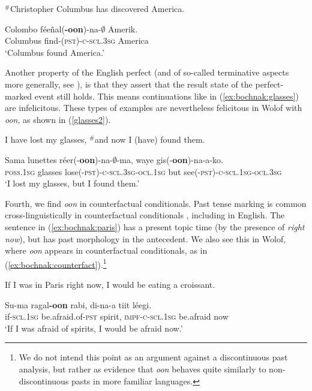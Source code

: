 \documentclass[output=paper,newtxmath,modfonts,nonflat,draftmode]{langsci/langscibook}
\begin{document}
\ea\label{columbus2}
$^{\#}$Christopher Columbus has discovered America.
\z

\ea\label{ex:bochnak:columbus}
\gll Colombo f\'ee\~nal(\textbf{-oon})-na-$\emptyset$ Amerik.\\
Columbus find-(\textsc{pst})\textsc{-c-scl.3sg} America\\
\glt `Columbus found America.'
\z

Another property of the English perfect (and of so-called terminative aspects more generally, see \citealt{bohnemeyer02grammar}), is that they assert that the result state of the perfect-marked event still holds. This means continuations like in (\ref{ex:bochnak:glasses}) are infelicitous. These types of examples are nevertheless felicitous in Wolof with \textit{oon}, as shown in (\ref{glasses2}).

\ea\label{ex:bochnak:glasses} 
I have lost my glasses, $^{\#}$and now I (have) found them. 
\z

\ea\label{glasses2}
\gll Sama lunettes r\'eer(-\textbf{oon})-na-$\emptyset$-ma, waye gis(-\textbf{oon})-na-a-ko. \\
\textsc{poss.1sg} glasses lose\textsc{(-pst)-c-scl.3sg-ocl.1sg} but see\textsc{(-pst)-c-scl.1sg-ocl.3sg} \\
\glt `I lost my glasses, but I found them.' 
\z

Fourth, we find \textit{oon} in counterfactual conditionals. Past tense marking is common cross-linguistically in counterfactual conditionals \citep{iatridou00grammatical, halpert12aspect}, including in English. The sentence in (\ref{ex:bochnak:paris}) has a present topic time (by the presence of \textit{right now}), but has past morphology in the antecedent. We also see this in Wolof, where \textit{oon} appears in counterfactual conditionals, as in (\ref{ex:bochnak:counterfact}).\footnote{We do not intend this point as an argument against a discontinuous past analysis, but rather as evidence that \textit{oon} behaves quite similarly to non-discontinuous pasts in more familiar languages.}  

\ea\label{ex:bochnak:paris} 
If I was in Paris right now, I would be eating a croissant. 
\z

\ea\label{ex:bochnak:counterfact}
\gll Su-ma ragal\textbf{-oon} rabi, di-na-a tiit l\'eegi.\\
if-\textsc{scl.1sg} be.afraid.of-\textsc{pst} spirit,
\textsc{impf-c-scl.1sg} be.afraid now\\
\glt `If I was afraid of spirits, I would be afraid now.'
\z
\end{document}
